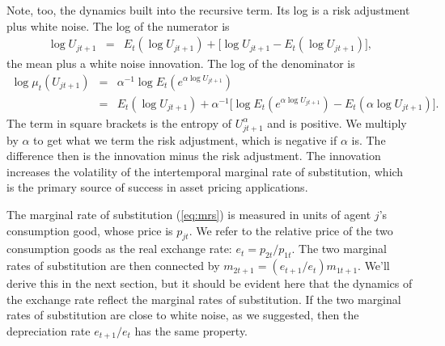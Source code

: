 Note, too, the dynamics built into the recursive term.
Its log is a risk adjustment plus white noise.
The log of the numerator is
\begin{eqnarray*}
    \log U_{jt+1} &=&  E_t (\log U_{jt+1}) + \big[\log U_{jt+1} - E_t (\log U_{jt+1})\big] ,
\end{eqnarray*}
the mean plus a white noise innovation.
The log of the denominator is
\begin{eqnarray*}
    \log \mu_t (U_{jt+1})
            &=&
            \alpha^{-1} \log E_t (e^{\alpha \log U_{jt+1}})   \\
                        &=& E_t (\log U_{jt+1}) +
            \alpha^{-1} \big[ \log E_t (e^{\alpha \log U_{jt+1}}) - E_t (\alpha \log U_{jt+1}) \big] .
\end{eqnarray*}
The term in square brackets is the entropy of $U_{jt+1}^\alpha$ and is positive.
We multiply by $\alpha$ to get what we term the risk adjustment, which is negative if $\alpha$ is.
The difference then is the innovation minus the risk adjustment.
The innovation increases the volatility of the intertemporal marginal rate of substitution,
which is the primary source of success in asset pricing
applications.

The marginal rate of substitution (\ref{eq:mrs}) is measured in units of agent $j$'s consumption good,
whose price is $p_{jt}$.
We refer to the relative price of the two consumption goods as the real exchange rate:
$ e_t = p_{2t}/p_{1t} $.
The two marginal rates of substitution are then connected by
$ m_{2t+1} = (e_{t+1}/e_t) m_{1t+1}$.
We'll derive this in the next section,
but it should be evident here that the dynamics of the exchange rate reflect the
marginal rates of substitution.
If the two marginal rates of substitution are close to white noise, as we suggested,
then the depreciation rate $e_{t+1}/e_t$ has the same property.


